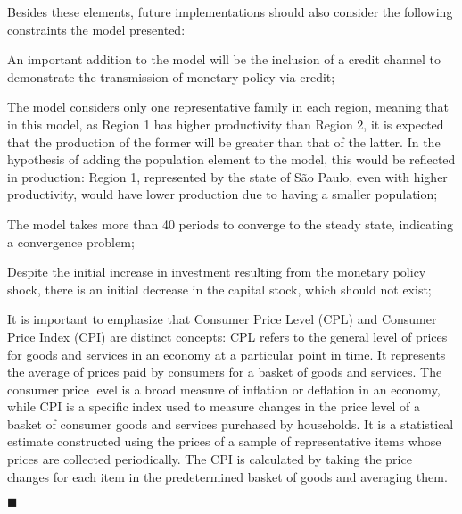 \documentclass[../thesis.tex]{subfiles}
\begin{document}
Besides these elements, future implementations should also consider the following constraints the model presented:
\begin{enumerate*}[label=(\arabic*)]

	\item An important addition to the model will be the inclusion of a credit channel to demonstrate the transmission of monetary policy via credit;
	
	\item The model considers only one representative family in each region, meaning that in this model, as Region 1 has higher productivity than Region 2, it is expected that the production of the former will be greater than that of the latter. In the hypothesis of adding the population element to the model, this would be reflected in production: Region 1, represented by the state of São Paulo, even with higher productivity, would have lower production due to having a smaller population;
	
	\item The model takes more than 40 periods to converge to the steady state, indicating a convergence problem;
	
	\item Despite the initial increase in investment resulting from the monetary policy shock, there is an initial decrease in the capital stock, which should not exist;
	
	\item It is important to emphasize that Consumer Price Level (CPL) and Consumer Price Index (CPI) are distinct concepts: CPL refers to the general level of prices for goods and services in an economy at a particular point in time. It represents the average of prices paid by consumers for a basket of goods and services. The consumer price level is a broad measure of inflation or deflation in an economy, while CPI is a specific index used to measure changes in the price level of a basket of consumer goods and services purchased by households. It is a statistical estimate constructed using the prices of a sample of representative items whose prices are collected periodically. The CPI is calculated by taking the price changes for each item in the predetermined basket of goods and averaging them.
	
\end{enumerate*} \hfill $\blacksquare$
\end{document}
